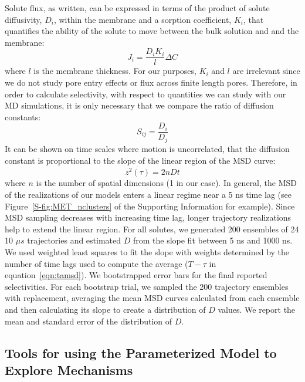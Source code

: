\documentclass[journal=jpcbfk,manuscript=article]{achemso}
\begin{document}
  Solute flux, as written, can be expressed in terms of the product of solute 
  diffusivity, $D_i$, within the membrane and a sorption coefficient, $K_i$, 
  that quantifies the ability of the solute to move between the bulk solution
  and and the membrane:
  \begin{equation}
    J_i = \frac{D_i K_i}{l}\Delta C
  \end{equation}
  where $l$ is the membrane thickness. For our purposes, $K_i$ and $l$ are 
  irrelevant since we do not study pore entry effects or flux across finite
  length pores. Therefore, in order to calculate selectivity, with respect
  to quantities we can study with our MD simulations, it is only necessary that
  we compare the ratio of diffusion constants:
  \begin{equation}
    S_{ij} = \frac{D_i}{D_j}
    \label{eqn:selectivity_diffusivity}
  \end{equation}
  It can be shown on time scales where motion is uncorrelated, that the diffusion
  constant is proportional to the slope of the linear region of the MSD 
  curve:~\cite{einstein_investigations_1956}
  \begin{equation}
    \overline{z^2(\tau)} = 2 n D t
    \label{eqn:msd_D}
  \end{equation}
  where $n$ is the number of spatial dimensions (1 in our case). In general, the 
  MSD of the realizations of our models enters a linear regime near a 5 ns time lag
  (see Figure~\ref{S-fig:MET_nclusters} of the Supporting Information for example).
  Since MSD sampling decreases with increasing time lag, longer trajectory 
  realizations help to extend the linear region.
  For all solutes, we generated 200 ensembles of 24 10 $\mu s$ trajectories and 
  estimated $D$ from the slope fit between 5 ns and 1000 ns. We used weighted 
  least squares to fit the slope with weights determined by the number of time 
  lags used to compute the average ($T - \tau$ in equation~\ref{eqn:tamsd}). 
  We bootstrapped error bars for the final reported selectivities. For each 
  bootstrap trial, we sampled the 200 trajectory ensembles with replacement, 
  averaging the mean MSD curves calculated from each ensemble and then calculating its 
  slope to create a distribution of $D$ values. We report the mean and standard
  error of the distribution of $D$.  
  
  \subsection{Tools for using the Parameterized Model to Explore Mechanisms}\label{method:interactions}
  
\end{document}
